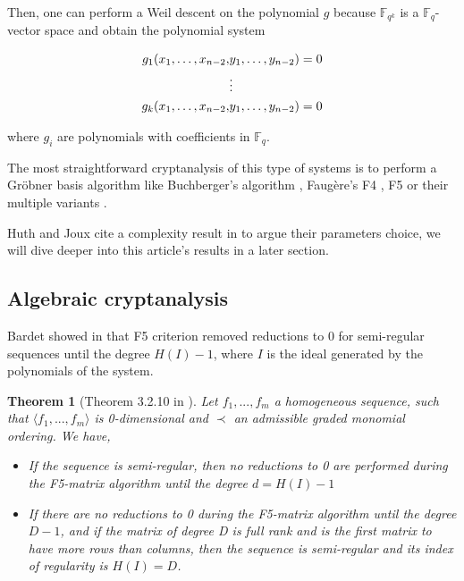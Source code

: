 \documentclass[english]{article}
\newtheorem{theorem}{Theorem}[section]
\begin{document}
		Then, one can perform a Weil descent on the polynomial $g$ because $\mathbb{F}_{q^k}$ is a $\mathbb{F}_q$-vector space and obtain the polynomial system
		

		\begin{align}
			g_1(x_1, \dots, x_{n-2},& y_1, \dots, y_{n-2}) = 0 \notag \\
			&\vdots \notag \\
			g_k(x_1, \dots, x_{n-2},& y_1, \dots, y_{n-2}) = 0 \notag
		\end{align}
		
		where $g_i$ are polynomials with coefficients in $\mathbb{F}_q$.
		
		The most straightforward cryptanalysis of this type of systems is to perform a Gröbner basis algorithm like Buchberger's algorithm \cite{Buc}, Faugère's F4 \cite{F99}, F5 \cite{F02} or their multiple variants \cite{EF19}.
		
		Huth and Joux cite a complexity result in \cite{FSS11} to argue their parameters choice, we will dive deeper into this article's results in a later section.

		\subsection{Algebraic cryptanalysis}
		
		Bardet showed in \cite{Bardet04} that F5 criterion removed reductions to 0 for semi-regular sequences until the degree $H(I) - 1$, where $I$ is the ideal generated by the polynomials of the system.
		
		\begin{theorem}[Theorem 3.2.10 in \cite{Bardet04}]
			Let $f_1,...,f_m$ a homogeneous sequence, such that $\langle f_1,...,f_m \rangle$ is 0-dimensional and
			$\prec$ an admissible graded monomial ordering. We have,
			\begin{itemize}
				\item[-] If the sequence is semi-regular, then no reductions to 0 are performed during the F5-matrix algorithm until the degree $d = H(I) - 1$
				\item[-] If there are no reductions to 0 during the F5-matrix algorithm until the degree $D - 1$, and if the matrix of degree D is full rank and is the first matrix to have more rows than columns, then the sequence is semi-regular and its index of regularity is $H(I) = D$.
			\end{itemize}
		\end{theorem}
		
\end{document}
